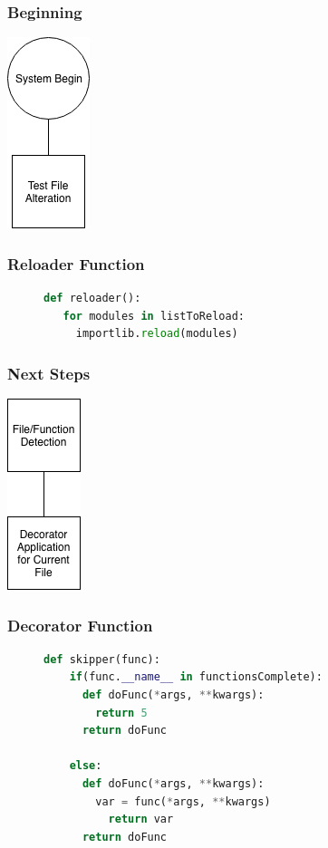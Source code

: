 \begin{frame}
  \frametitle{Beginning}
  \begin{center}
    \includegraphics[scale = .5]{images/beginning}
  \end{center}
\end{frame}

\begin{frame}[fragile]
  \frametitle{Reloader Function}
  \begin{figure}[t!, scale = .75]
	\begin{lstlisting}[language = Python, basicstyle=\small, backgroundcolor = \color{lightgray}]
 def reloader():
   for modules in listToReload:
     importlib.reload(modules)
\end{lstlisting}
  \end{figure}
\end{frame}

\begin{frame}
  \frametitle{Next Steps}
  \begin{center}
    \includegraphics[scale = .5]{images/second}
  \end{center}
\end{frame}

\begin{frame}[fragile]
  \frametitle{Decorator Function}
  \begin{figure}[t!, scale = .75]
	\begin{lstlisting}[language = Python, basicstyle=\small, backgroundcolor = \color{lightgray}]
  def skipper(func):
    if(func.__name__ in functionsComplete):
      def doFunc(*args, **kwargs):
        return 5
      return doFunc

    else:
      def doFunc(*args, **kwargs):
        var = func(*args, **kwargs)
          return var
      return doFunc
  \end{lstlisting}
\end{figure}
\end{frame}

